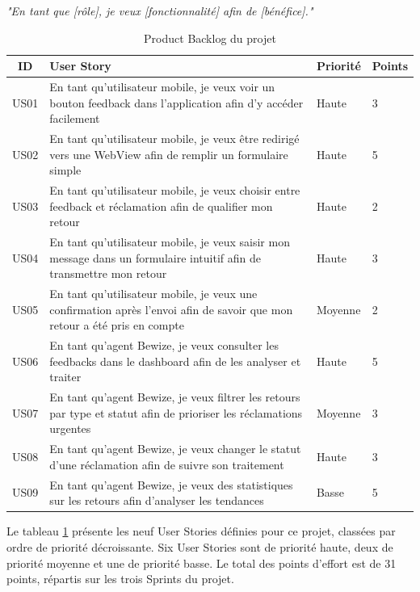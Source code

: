\begin{center}
\textit{"En tant que [rôle], je veux [fonctionnalité] afin de [bénéfice]."}
\end{center}

\begin{table}[H]
\centering
\caption{Product Backlog du projet}
\label{tab:product_backlog}
\renewcommand{\arraystretch}{1.8}
\begin{tabular}{|c|p{7.5cm}|p{1.8cm}|p{1.5cm}|}
\hline
\textbf{ID} & \textbf{User Story} & \textbf{Priorité} & \textbf{Points} \\
\hline
US01 & En tant qu'utilisateur mobile, je veux voir un bouton feedback 
dans l'application afin d'y accéder facilement & Haute & 3 \\
\hline
US02 & En tant qu'utilisateur mobile, je veux être redirigé vers une 
WebView afin de remplir un formulaire simple & Haute & 5 \\
\hline
US03 & En tant qu'utilisateur mobile, je veux choisir entre feedback 
et réclamation afin de qualifier mon retour & Haute & 2 \\
\hline
US04 & En tant qu'utilisateur mobile, je veux saisir mon message dans 
un formulaire intuitif afin de transmettre mon retour & Haute & 3 \\
\hline
US05 & En tant qu'utilisateur mobile, je veux une confirmation après 
l'envoi afin de savoir que mon retour a été pris en compte & Moyenne & 2 \\
\hline
US06 & En tant qu'agent Bewize, je veux consulter les feedbacks dans 
le dashboard afin de les analyser et traiter & Haute & 5 \\
\hline
US07 & En tant qu'agent Bewize, je veux filtrer les retours par type 
et statut afin de prioriser les réclamations urgentes & Moyenne & 3 \\
\hline
US08 & En tant qu'agent Bewize, je veux changer le statut d'une 
réclamation afin de suivre son traitement & Haute & 3 \\
\hline
US09 & En tant qu'agent Bewize, je veux des statistiques sur les 
retours afin d'analyser les tendances & Basse & 5 \\
\hline
\end{tabular}
\end{table}

Le tableau \ref{tab:product_backlog} présente les neuf User Stories 
définies pour ce projet, classées par ordre de priorité décroissante. 
Six User Stories sont de priorité haute, deux de priorité moyenne et 
une de priorité basse. Le total des points d'effort est de 31 points, 
répartis sur les trois Sprints du projet.

